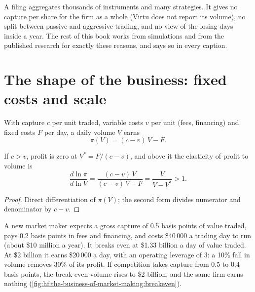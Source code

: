 \begin{remark}\label{rem:hf:the-business-of-market-making:limits}
A filing aggregates thousands of instruments and many strategies. It gives no capture per share for the firm as a whole (Virtu does not report its
volume), no split between passive and aggressive trading, and no view of the losing days inside a year. The rest of this book works from
simulations and from the published research for exactly these reasons, and says so in every caption.
\end{remark}

\section{The shape of the business: fixed costs and scale}

With capture $c$ per unit traded, variable costs $v$ per unit (fees, financing) and fixed costs $F$ per day, a daily volume $V$ earns
\[
\pi(V)=(c-v)\,V-F .
\]

\begin{proposition}\label{prop:hf:the-business-of-market-making:leverage}
If $c>v$, profit is zero at $V^\ast=F/(c-v)$, and above it the elasticity of profit to volume is
\[
\frac{d\ln\pi}{d\ln V}=\frac{(c-v)\,V}{(c-v)\,V-F}=\frac{V}{V-V^\ast}>1 .
\]
\end{proposition}

\begin{proof}
Direct differentiation of $\pi(V)$; the second form divides numerator and denominator by $c-v$.
\end{proof}

\begin{example}\label{ex:hf:the-business-of-market-making:small}
A new market maker expects a gross capture of 0.5 basis points of value traded, pays 0.2 basis points in fees and financing, and costs \$40\,000 a
trading day to run (about \$10 million a year). It breaks even at \$1.33 billion a day of value traded. At \$2 billion it earns \$20\,000 a day,
with an operating leverage of 3: a 10\% fall in volume removes 30\% of its profit. If competition takes capture from 0.5 to 0.4 basis points, the
break-even volume rises to \$2 billion, and the same firm earns nothing (\cref{fig:hf:the-business-of-market-making:breakeven}).
\end{example}

